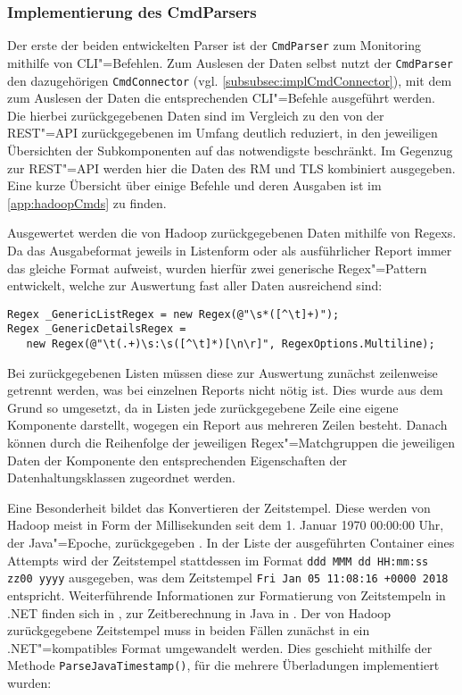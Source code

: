 \subsubsection{Implementierung des CmdParsers}
\label{subsubsec:implCmdParser}

Der erste der beiden entwickelten Parser ist der \texttt{CmdParser} zum Monitoring mithilfe von \gls{CLI}"=Befehlen.
Zum Auslesen der Daten selbst nutzt der \texttt{CmdParser} den dazugehörigen \texttt{CmdConnector} (vgl. \cref{subsubsec:implCmdConnector}), mit dem zum Auslesen der Daten die entsprechenden \gls{CLI}"=Befehle ausgeführt werden.
Die hierbei zurückgegebenen Daten sind im Vergleich zu den von der REST"=API zurückgegebenen im Umfang deutlich reduziert, in den jeweiligen Übersichten der Subkomponenten auf das notwendigste beschränkt.
Im Gegenzug zur REST"=API werden hier die Daten des \gls{RM} und \gls{TLS} kombiniert ausgegeben.
Eine kurze Übersicht über einige Befehle und deren Ausgaben ist im \cref{app:hadoopCmds} zu finden.

Ausgewertet werden die von Hadoop zurückgegebenen Daten mithilfe von \glspl{Regex}.
Da das Ausgabeformat jeweils in Listenform oder als ausführlicher Report immer das gleiche Format aufweist, wurden hierfür zwei generische Regex"=Pattern entwickelt, welche zur Auswertung fast aller Daten ausreichend sind:

\begin{lstlisting}[label=lst:cmdRegexPattern,style=cs,
caption={[Implementierte \glsentryshort{Regex}"=Pattern des CmdParsers]
    Implementierte \acrshort{Regex}"=Pattern des \texttt{CmdParser}s}]
Regex _GenericListRegex = new Regex(@"\s*([^\t]+)");
Regex _GenericDetailsRegex =
   new Regex(@"\t(.+)\s:\s([^\t]*)[\n\r]", RegexOptions.Multiline);
\end{lstlisting}

Bei zurückgegebenen Listen müssen diese zur Auswertung zunächst zeilenweise getrennt werden, was bei einzelnen Reports nicht nötig ist.
Dies wurde aus dem Grund so umgesetzt, da in Listen jede zurückgegebene Zeile eine eigene Komponente darstellt, wogegen ein Report aus mehreren Zeilen besteht.
Danach können durch die Reihenfolge der jeweiligen Regex"=Matchgruppen die jeweiligen Daten der Komponente den entsprechenden Eigenschaften der Datenhaltungsklassen zugeordnet werden.

Eine Besonderheit bildet das Konvertieren der Zeitstempel.
Diese werden von Hadoop meist in Form der Millisekunden seit dem 1. Januar 1970 00:00:00 Uhr, der Java"=Epoche, zurückgegeben \cite{HadoopRmApi271,HadoopNmApi271,HadoopYarnTlServer271,JavaInstantDoc}.
In der Liste der ausgeführten Container eines Attempts wird der Zeitstempel stattdessen im Format \texttt{ddd MMM dd HH:mm:ss zz00 yyyy} ausgegeben, was \zB dem Zeitstempel \texttt{Fri Jan 05 11:08:16 +0000 2018} entspricht.
Weiterführende Informationen zur Formatierung von Zeitstempeln in .NET finden sich in \cite{CsTimeFormatStrings}, zur Zeitberechnung in Java \uA in \cite{JavaInstantDoc}.
Der von Hadoop zurückgegebene Zeitstempel muss in beiden Fällen zunächst in ein .NET"=kompatibles Format umgewandelt werden.
Dies geschieht mithilfe der Methode \texttt{ParseJavaTimestamp()}, für die mehrere Überladungen implementiert wurden:

